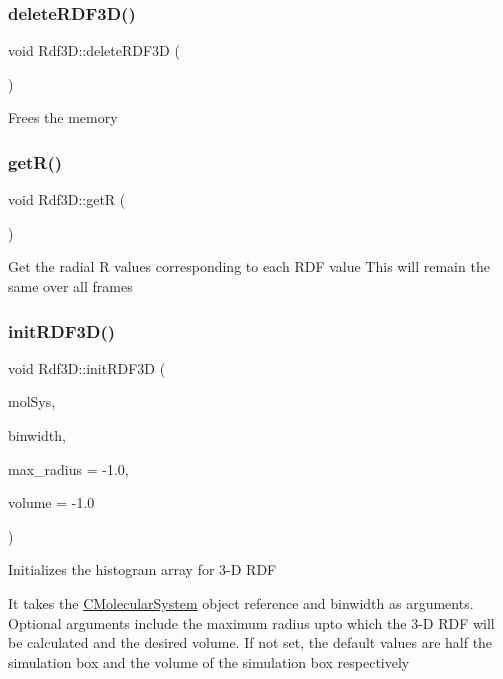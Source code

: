 \subsubsection{\texorpdfstring{delete\+R\+D\+F3\+D()}{deleteRDF3D()}}
{\footnotesize\ttfamily void Rdf3\+D\+::delete\+R\+D\+F3D (\begin{DoxyParamCaption}{ }\end{DoxyParamCaption})}

Frees the memory \mbox{\label{classRdf3D_ade47a2d360bcc0112f0da45baef6e609}} 
\subsubsection{\texorpdfstring{get\+R()}{getR()}}
{\footnotesize\ttfamily void Rdf3\+D\+::getR (\begin{DoxyParamCaption}{ }\end{DoxyParamCaption})}

Get the radial R values corresponding to each R\+DF value This will remain the same over all frames \mbox{\label{classRdf3D_aa86b927b22b369cd1d6ead93c17e43ee}} 
\subsubsection{\texorpdfstring{init\+R\+D\+F3\+D()}{initRDF3D()}}
{\footnotesize\ttfamily void Rdf3\+D\+::init\+R\+D\+F3D (\begin{DoxyParamCaption}\item[{class \mbox{\hyperlink{classCMolecularSystem}{C\+Molecular\+System}} \&}]{mol\+Sys,  }\item[{double}]{binwidth,  }\item[{double}]{max\+\_\+radius = {\ttfamily -\/1.0},  }\item[{double}]{volume = {\ttfamily -\/1.0} }\end{DoxyParamCaption})}

Initializes the histogram array for 3-\/D R\+DF

It takes the \mbox{\hyperlink{classCMolecularSystem}{C\+Molecular\+System}} object reference and binwidth as arguments. Optional arguments include the maximum radius upto which the 3-\/D R\+DF will be calculated and the desired volume. If not set, the default values are half the simulation box and the volume of the simulation box respectively \mbox{\label{classRdf3D_a08d573ef51fd88bd42456a76fc3d7ca4}} 
